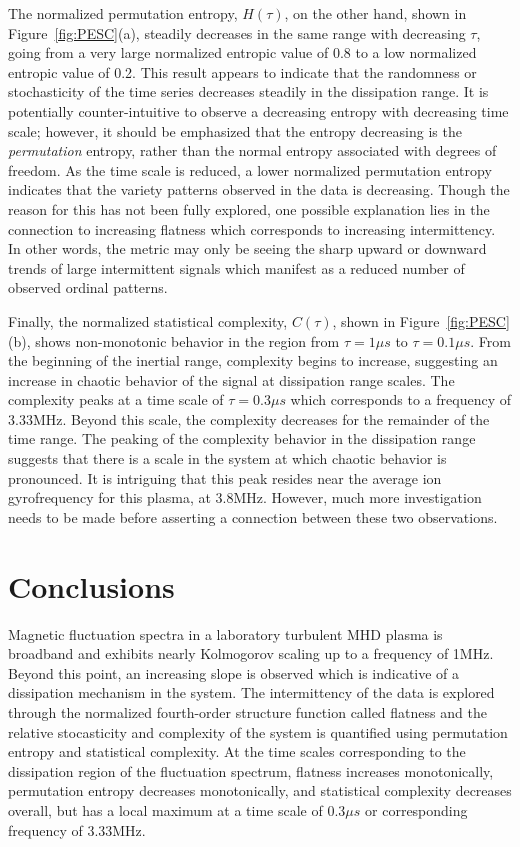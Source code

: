 \documentclass[aip,pop,amsmath,amssymb,preprint,superscriptaddress]{revtex4-1} %
\begin{document}
The normalized permutation entropy, $H(\tau)$, on the other hand, shown in Figure~\ref{fig:PESC}(a), steadily decreases in the same range with decreasing $\tau$, going from a very large normalized entropic value of 0.8 to a low normalized entropic value of 0.2. This result appears to indicate that the randomness or stochasticity of the time series decreases steadily in the dissipation range. It is potentially counter-intuitive to observe a decreasing entropy with decreasing time scale; however, it should be emphasized that the entropy decreasing is the {\it permutation} entropy, rather than the normal entropy associated with degrees of freedom. As the time scale is reduced, a lower normalized permutation entropy indicates that the variety patterns observed in the data is decreasing. Though the reason for this has not been fully explored, one possible explanation lies in the connection to increasing flatness which corresponds to increasing intermittency. In other words, the metric may only be seeing the sharp upward or downward trends of large intermittent signals which manifest as a reduced number of observed ordinal patterns.  

Finally, the normalized statistical complexity, $C(\tau)$, shown in Figure~\ref{fig:PESC}(b), shows non-monotonic behavior in the region from $\tau = 1\mu s$ to $\tau = 0.1\mu s$. From the beginning of the inertial range, complexity begins to increase, suggesting an increase in chaotic behavior of the signal at dissipation range scales. The complexity peaks at a time scale of $\tau = 0.3\mu s$ which corresponds to a frequency of 3.33MHz. Beyond this scale, the complexity decreases for the remainder of the time range. The peaking of the complexity behavior in the dissipation range suggests that there is a scale in the system at which chaotic behavior is pronounced. It is intriguing that this peak resides near the average ion gyrofrequency for this plasma, at 3.8MHz. However, much more investigation needs to be made before asserting a connection between these two observations.

\section{Conclusions}

Magnetic fluctuation spectra in a laboratory turbulent MHD plasma is broadband and exhibits nearly Kolmogorov scaling up to a frequency of 1MHz. Beyond this point, an increasing slope is observed which is indicative of a dissipation mechanism in the system. The intermittency of the data is explored through the normalized fourth-order structure function called flatness and the relative stocasticity and complexity of the system is quantified using permutation entropy and statistical complexity. At the time scales corresponding to the dissipation region of the fluctuation spectrum, flatness increases monotonically, permutation entropy decreases monotonically, and statistical complexity decreases overall, but has a local maximum at a time scale of $0.3\mu s$ or corresponding frequency of 3.33MHz. 
\end{document}

